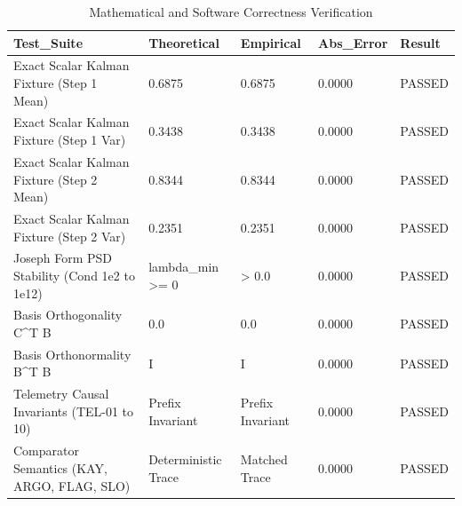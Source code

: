 \begin{table}[htbp]
\centering
\caption{Mathematical and Software Correctness Verification}
\label{tab:table_T3_mathematical_verification}
\begin{tabular}{lllll}
\hline
Test\_Suite & Theoretical & Empirical & Abs\_Error & Result \\
\hline
Exact Scalar Kalman Fixture (Step 1 Mean) & 0.6875 & 0.6875 & 0.0000 & PASSED \\
Exact Scalar Kalman Fixture (Step 1 Var) & 0.3438 & 0.3438 & 0.0000 & PASSED \\
Exact Scalar Kalman Fixture (Step 2 Mean) & 0.8344 & 0.8344 & 0.0000 & PASSED \\
Exact Scalar Kalman Fixture (Step 2 Var) & 0.2351 & 0.2351 & 0.0000 & PASSED \\
Joseph Form PSD Stability (Cond 1e2 to 1e12) & lambda\_min >= 0 & > 0.0 & 0.0000 & PASSED \\
Basis Orthogonality C^T B & 0.0 & 0.0 & 0.0000 & PASSED \\
Basis Orthonormality B^T B & I & I & 0.0000 & PASSED \\
Telemetry Causal Invariants (TEL-01 to 10) & Prefix Invariant & Prefix Invariant & 0.0000 & PASSED \\
Comparator Semantics (KAY, ARGO, FLAG, SLO) & Deterministic Trace & Matched Trace & 0.0000 & PASSED \\
\hline
\end{tabular}
\end{table}

